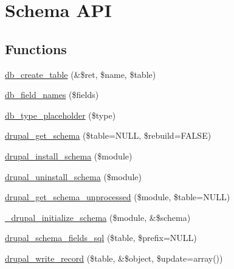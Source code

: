 \hypertarget{group__schemaapi}{
\section{Schema API}
\label{group__schemaapi}
}
\subsection*{Functions}
\begin{CompactItemize}
\item 
\hyperlink{group__schemaapi_gb7a73e88621851e4bed62fd6063eb2f9}{db\_\-create\_\-table} (\&\$ret, \$name, \$table)
\item 
\hyperlink{group__schemaapi_geb423ba53e5133548abe3d999f86e787}{db\_\-field\_\-names} (\$fields)
\item 
\hyperlink{group__schemaapi_g1d594f0ad0eab77e4b925887be7e4b08}{db\_\-type\_\-placeholder} (\$type)
\end{CompactItemize}
\begin{CompactItemize}
\item 
\hyperlink{group__schemaapi_g979670bd6bd2e34337ffc5f0810f2d71}{drupal\_\-get\_\-schema} (\$table=NULL, \$rebuild=FALSE)
\item 
\hyperlink{group__schemaapi_g9706b8d6ecdac10302d83bd50935a698}{drupal\_\-install\_\-schema} (\$module)
\item 
\hyperlink{group__schemaapi_g0688b6627af9dc05f2618f81489c3db0}{drupal\_\-uninstall\_\-schema} (\$module)
\item 
\hyperlink{group__schemaapi_gecb0d63f03b96dd1426298804e091d3b}{drupal\_\-get\_\-schema\_\-unprocessed} (\$module, \$table=NULL)
\item 
\hyperlink{group__schemaapi_g7bd9447538f3e7c5baec5d8d67db164c}{\_\-drupal\_\-initialize\_\-schema} (\$module, \&\$schema)
\item 
\hyperlink{group__schemaapi_gacfcd6f676ee9062f0ba50a008a05443}{drupal\_\-schema\_\-fields\_\-sql} (\$table, \$prefix=NULL)
\item 
\hyperlink{group__schemaapi_g85da8424c4111b46aefb6fcb3a899c7d}{drupal\_\-write\_\-record} (\$table, \&\$object, \$update=array())
\end{CompactItemize}
